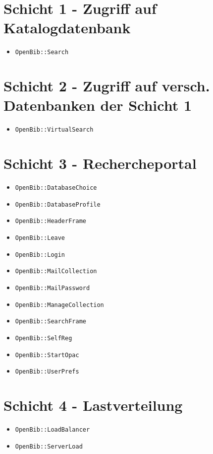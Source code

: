 \documentclass[11pt, twoside, a4paper, BCOR8mm, DIV12, bibtotoc,idxtotoc]{scrbook}
\begin{document}
\begin{itemize}
\section{Schicht 1 - Zugriff auf Katalogdatenbank}

\begin{itemize}
\item \texttt{OpenBib::Search}
\end{itemize}

\section{Schicht 2 - Zugriff auf versch. Datenbanken der Schicht 1}

\begin{itemize}
\item \texttt{OpenBib::VirtualSearch}
\end{itemize}

\section{Schicht 3 - Rechercheportal}

\begin{itemize}
\item \texttt{OpenBib::DatabaseChoice}
\item \texttt{OpenBib::DatabaseProfile}
\item \texttt{OpenBib::HeaderFrame}
\item \texttt{OpenBib::Leave}
\item \texttt{OpenBib::Login}
\item \texttt{OpenBib::MailCollection}
\item \texttt{OpenBib::MailPassword}
\item \texttt{OpenBib::ManageCollection}
\item \texttt{OpenBib::SearchFrame}
\item \texttt{OpenBib::SelfReg}
\item \texttt{OpenBib::StartOpac}
\item \texttt{OpenBib::UserPrefs}
\end{itemize}

\section{Schicht 4 - Lastverteilung}

\begin{itemize}
\item \texttt{OpenBib::LoadBalancer}
\item \texttt{OpenBib::ServerLoad}
\end{itemize}



\end{itemize}
\end{document}
